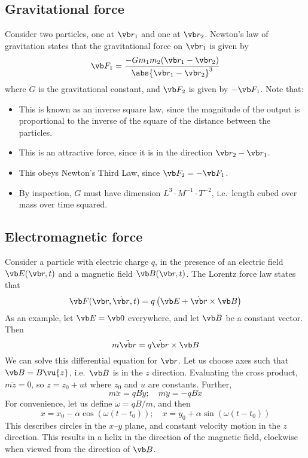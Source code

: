 \subsection{Gravitational force}
Consider two particles, one at \(\vb r_1\) and one at \(\vb r_2\).
Newton's law of gravitation states that the gravitational force on \(\vb r_1\) is given by
\[
	\vb F_1 = \frac{- G m_1 m_2 (\vb r_1 - \vb r_2)}{\abs{\vb r_1 - \vb r_2}^3}
\]
where \(G\) is the gravitational constant, and \(\vb F_2\) is given by \(-\vb F_1\).
Note that:
\begin{itemize}
	\item This is known as an inverse square law, since the magnitude of the output is proportional to the inverse of the square of the distance between the particles.
	\item This is an attractive force, since it is in the direction \(\vb r_2 - \vb r_1\).
	\item This obeys Newton's Third Law, since \(\vb F_2 = - \vb F_1\).
	\item By inspection, \(G\) must have dimension \(L^3 \cdot M^{-1} \cdot T^{-2}\), i.e.\ length cubed over mass over time squared.
\end{itemize}

\subsection{Electromagnetic force}
Consider a particle with electric charge \(q\), in the presence of an electric field \(\vb E(\vb r, t)\) and a magnetic field \(\vb B(\vb r, t)\).
The Lorentz force law states that
\[
	\vb F(\vb r, \dot{\vb r}, t) = q\left( \vb E + \dot{\vb r} \times \vb B \right)
\]
As an example, let \(\vb E = \vb 0\) everywhere, and let \(\vb B\) be a constant vector.
Then
\[
	m \ddot{\vb r} = q \dot{\vb r} \times \vb B
\]
We can solve this differential equation for \(\vb r\).
Let us choose axes such that \(\vb B = B \vu{z}\), i.e.\ \(\vb B\) is in the \(z\) direction.
Evaluating the cross product, \(m \ddot{z} = 0\), so \(z = z_0 + ut\) where \(z_0\) and \(u\) are constants.
Further,
\[
	m \ddot x = qB\dot y;\quad m \ddot y = -qB\dot x
\]
For convenience, let us define \(\omega = qB/m\), and then
\[
	x = x_0 - \alpha \cos(\omega(t - t_0));\quad x = y_0 + \alpha \sin(\omega(t - t_0))
\]
This describes circles in the \(x\)--\(y\) plane, and constant velocity motion in the \(z\) direction.
This results in a helix in the direction of the magnetic field, clockwise when viewed from the direction of \(\vb B\).
